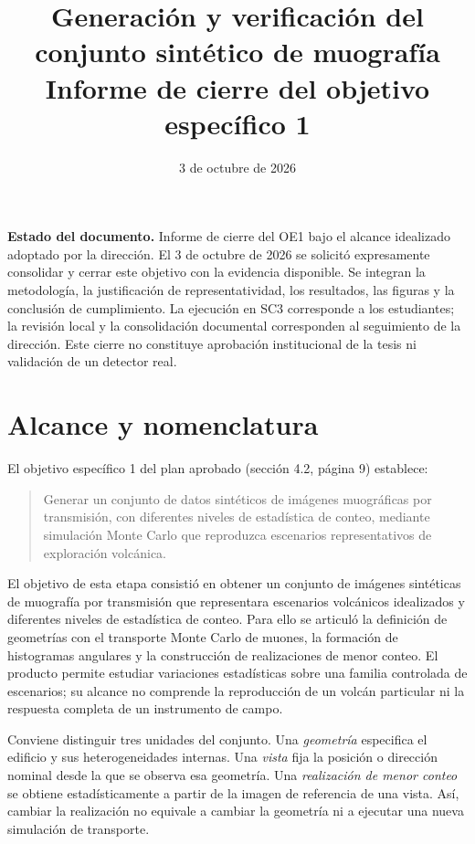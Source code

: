 \documentclass[11pt,a4paper]{article}
\title{Generación y verificación del conjunto sintético de muografía\\Informe de cierre del objetivo específico 1}
\author{}
\date{3 de octubre de 2026}
\begin{document}
\maketitle

\noindent\textbf{Estado del documento.} Informe de cierre del OE1 bajo el alcance idealizado adoptado por la dirección. El 3 de octubre de 2026 se solicitó expresamente consolidar y cerrar este objetivo con la evidencia disponible. Se integran la metodología, la justificación de representatividad, los resultados, las figuras y la conclusión de cumplimiento. La ejecución en SC3 corresponde a los estudiantes; la revisión local y la consolidación documental corresponden al seguimiento de la dirección. Este cierre no constituye aprobación institucional de la tesis ni validación de un detector real.

\begingroup\small\tableofcontents\endgroup\clearpage

\section{Alcance y nomenclatura}

El objetivo específico 1 del plan aprobado (sección 4.2, página 9) establece:
\begin{quote}
Generar un conjunto de datos sintéticos de imágenes muográficas por transmisión, con diferentes niveles de estadística de conteo, mediante simulación Monte Carlo que reproduzca escenarios representativos de exploración volcánica.
\end{quote}

El objetivo de esta etapa consistió en obtener un conjunto de imágenes sintéticas de muografía por transmisión que representara escenarios volcánicos idealizados y diferentes niveles de estadística de conteo. Para ello se articuló la definición de geometrías con el transporte Monte Carlo de muones, la formación de histogramas angulares y la construcción de realizaciones de menor conteo. El producto permite estudiar variaciones estadísticas sobre una familia controlada de escenarios; su alcance no comprende la reproducción de un volcán particular ni la respuesta completa de un instrumento de campo.

Conviene distinguir tres unidades del conjunto. Una \emph{geometría} especifica el edificio y sus heterogeneidades internas. Una \emph{vista} fija la posición o dirección nominal desde la que se observa esa geometría. Una \emph{realización de menor conteo} se obtiene estadísticamente a partir de la imagen de referencia de una vista. Así, cambiar la realización no equivale a cambiar la geometría ni a ejecutar una nueva simulación de transporte.
\end{document}
